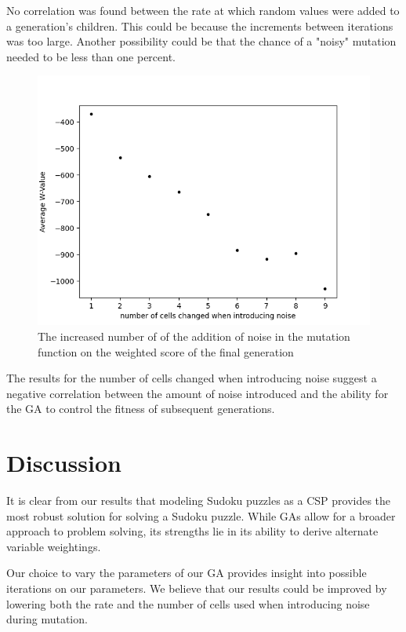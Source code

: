 \documentclass[12pt, conference]{IEEEtran}
\begin{document}
\par
No correlation was found between the rate at which random values were added to a generation's children.
This could be because the increments between iterations was too large.
Another possibility could be that the chance of a "noisy" mutation needed to be less than one percent.


\begin{figure}[H]
\centerline{\includegraphics[scale=0.5]{Figures/Mutation_Number_Averages.png}}
\caption{The increased number of   of the addition of noise in the mutation function on the weighted score of the final generation}
\label{fig. 2}
\end{figure}

\par
The results for the number of cells changed when introducing noise suggest a negative correlation between the amount of noise introduced and the ability for the GA to control the fitness of subsequent generations.

\section{Discussion}
It is clear from our results that modeling Sudoku puzzles as a CSP provides the most robust solution for solving a Sudoku puzzle.
While GAs allow for a broader approach to problem solving, its strengths lie in its ability to derive alternate variable weightings.

\par
Our choice to vary the parameters of our GA provides insight into possible iterations on our parameters.
We believe that our results could be improved by lowering both the rate and the number of cells used when introducing noise during mutation.
\end{document}
